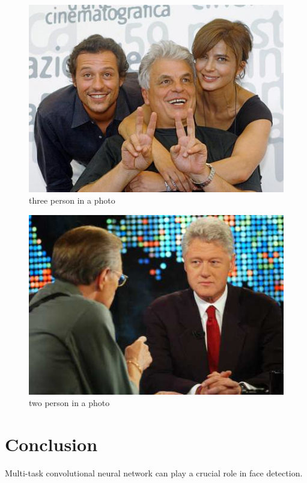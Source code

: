 \documentclass[journal, a4paper]{IEEEtran}
\begin{document}
	\begin{figure}
		\begin{center}
		\includegraphics[width=\columnwidth]{images/img_13692.jpg}
		\caption{three person in a photo}
		\label{fig:13692_raw}
		\end{center}
	\end{figure}
	\begin{figure}
		\begin{center}
		\includegraphics[width=\columnwidth]{images/img_13869.jpg}
		\caption{two person in a photo}
		\label{fig:13869_raw}
		\end{center}
	\end{figure}

\section{Conclusion}
	Multi-task convolutional neural network can play a crucial role in face detection.

\printbibliography

\end{document}
